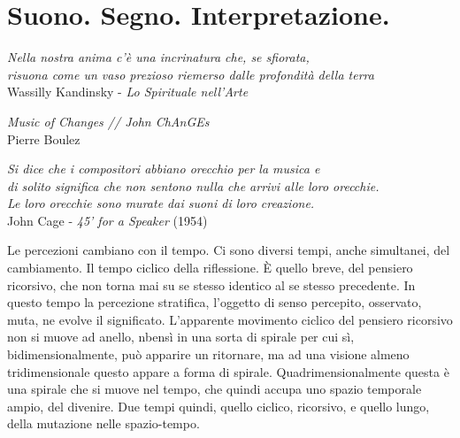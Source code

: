 

\chapter*{Suono. Segno. Interpretazione.}

	\begin{flushright}
		\textit{Nella nostra anima c'\`e una incrinatura che, se sfiorata, \\
		risuona come un vaso prezioso riemerso dalle profondit\`a della terra} \\
		Wassilly Kandinsky - \emph{Lo Spirituale nell'Arte}
	\end{flushright}

	\begin{flushright}
		\textit{Music of Changes // John ChAnGEs} \\
		Pierre Boulez
	\end{flushright}

	\begin{flushright}
		\textit{Si dice che i compositori abbiano orecchio per la musica e \\
		di solito significa che non sentono nulla che arrivi alle loro orecchie. \\
		Le loro orecchie sono murate dai suoni di loro creazione.} \\
		John Cage - \emph{45' for a Speaker} (1954)
	\end{flushright}

\bigskip


Le percezioni cambiano con il tempo. Ci sono diversi tempi, anche simultanei, del cambiamento.
Il tempo ciclico della riflessione. È quello breve, del pensiero ricorsivo, che non torna mai su se stesso identico al se stesso precedente.
In questo tempo la percezione stratifica, l'oggetto di senso percepito, osservato, muta, ne evolve il significato.
L'apparente movimento ciclico del pensiero ricorsivo non si muove ad anello, nbensì in una sorta di spirale per cui sì, bidimensionalmente, può apparire un ritornare, ma ad una visione almeno tridimensionale questo appare a forma di spirale.
Quadrimensionalmente questa è una spirale che si muove nel tempo, che quindi accupa uno spazio temporale ampio, del divenire. Due tempi quindi, quello ciclico, ricorsivo, e quello lungo, della mutazione nelle spazio-tempo.

